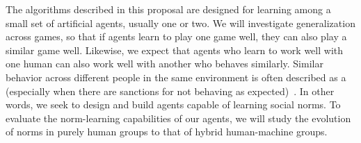 
The algorithms described in this proposal are designed for learning
among a small set of artificial agents, usually one or two.  We will
investigate generalization across games, so that if agents learn to
play one game well, they can also play a similar game well.
%
Likewise, we expect that agents who learn to work well with one human
can also work well with another who behaves similarly.  Similar
behavior across different people in the same environment is often
described as a  (especially when there are
sanctions for not behaving as expected)~\cite{bicchieri2005grammar}.
In other words, we seek to design and build agents capable of learning
social norms.  To evaluate the norm-learning capabilities of our
agents, we will study the evolution of norms in purely human groups to
that of hybrid human-machine groups.



